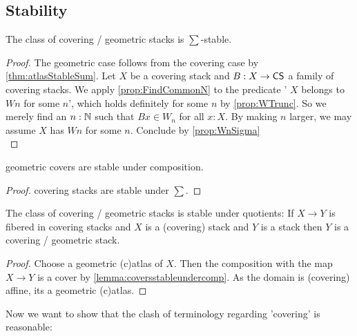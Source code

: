 \subsection{Stability}
\begin{theorem}{\label{thm:CSSum}}
	The class of covering / geometric stacks is $\sum$-stable.
\end{theorem}
\begin{proof}
	The geometric case follows from the covering case by \ref{thm:atlasStableSum}.
	Let $X$ be a covering stack and $B : X \to \mathsf{CS}$ a family of covering stacks.
	We apply \ref{prop:FindCommonN} to the predicate ' $X$ belongs to $W n$ for some $n$', which holds definitely for some $n$ by \ref{prop:WTrunc}.
	So we merely find an $n : \mathbb{N}$ such that $B x \in W_n $ for all $x : X$. By making $n$ larger, we may assume $X$ has $W n$ for some $n$. Conclude by \ref{prop:WnSigma}\\


\end{proof}
\begin{lemma}{\label{lemma:coversstableundercomp}}
	geometric covers are stable under composition.
\end{lemma}
\begin{proof}
	covering stacks are stable under $\sum$.
\end{proof}


\begin{prop}{\label{prop:stackQuot}}
	The class of covering / geometric stacks is stable under quotients: If $X \to Y$ is fibered in covering stacks and $X$ is a (covering) stack and $Y$ is a stack then $Y$ is a covering / geometric stack.
\end{prop}
\begin{proof}
	Choose a geometric (c)atlas of $X$. Then the composition with the map $X \to Y$ is a cover by \ref{lemma:coversstableundercomp}. As the domain is (covering) affine, its a geometric (c)atlas.
\end{proof}
Now we want to show that the clash of terminology regarding 'covering' is reasonable:


